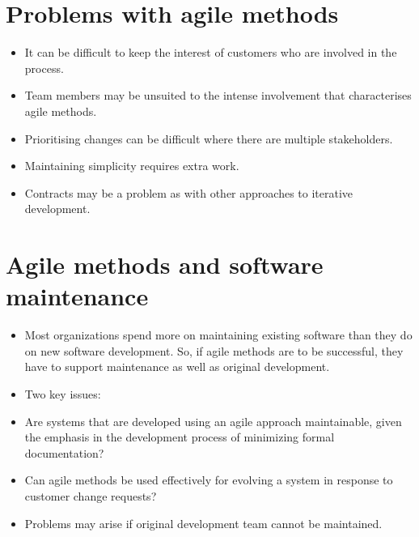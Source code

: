  \section{ Problems with agile methods}
 \begin{itemize}


\item It can be difficult to keep the interest of customers who are involved in the process.

\item Team members may be unsuited to the intense involvement that characterises agile methods.

\item Prioritising changes can be difficult where there are multiple stakeholders.

\item Maintaining simplicity requires extra work.

\item Contracts may be a problem as with other approaches to iterative development.

\end{itemize}
\section{ Agile methods and software maintenance}
\begin{itemize}

\item Most organizations spend more on maintaining existing software than they do on new software development. So, if agile methods are to be successful, they have to support maintenance as well as original development.

\item Two key issues:

\item Are systems that are developed using an agile approach maintainable, given the emphasis in the development process of minimizing formal documentation?
\item Can agile methods be used effectively for evolving a system in response to customer change requests?

\item Problems may arise if original development team cannot be maintained.


\end{itemize}
